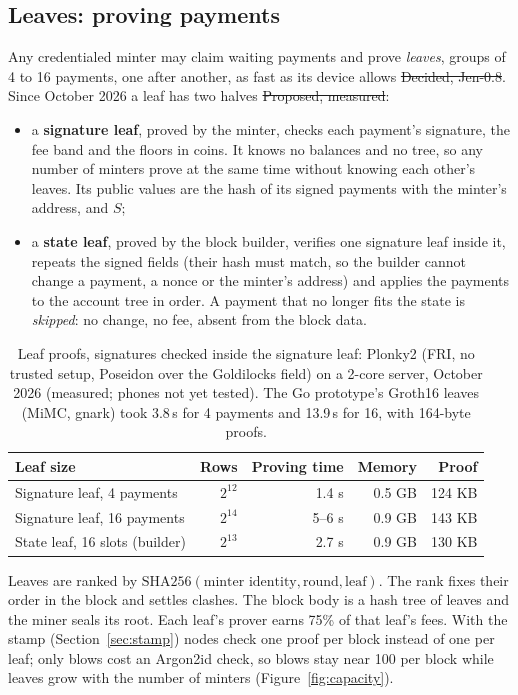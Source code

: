\subsection{Leaves: proving payments}
Any credentialed minter may claim waiting payments and prove \emph{leaves}, groups of 4 to 16 payments, one after another, as fast as its device allows \st{Decided, Jen-0.8}. Since October 2026 a leaf has two halves \st{Proposed, measured}:
\begin{itemize}
\item a \textbf{signature leaf}, proved by the minter, checks each payment's signature, the fee band and the floors in coins. It knows no balances and no tree, so any number of minters prove at the same time without knowing each other's leaves. Its public values are the hash of its signed payments with the minter's address, and $S$;
\item a \textbf{state leaf}, proved by the block builder, verifies one signature leaf inside it, repeats the signed fields (their hash must match, so the builder cannot change a payment, a nonce or the minter's address) and applies the payments to the account tree in order. A payment that no longer fits the state is \emph{skipped}: no change, no fee, absent from the block data.
\end{itemize}

\begin{table}[htbp]
\centering\small
\begin{tabular}{l r r r r}
\toprule
\textbf{Leaf size} & \textbf{Rows} & \textbf{Proving time} & \textbf{Memory} & \textbf{Proof}\\
\midrule
Signature leaf, 4 payments & $2^{12}$ & 1.4 s & 0.5 GB & 124 KB\\
Signature leaf, 16 payments & $2^{14}$ & 5--6 s & 0.9 GB & 143 KB\\
State leaf, 16 slots (builder) & $2^{13}$ & 2.7 s & 0.9 GB & 130 KB\\
\bottomrule
\end{tabular}
\caption{Leaf proofs, signatures checked inside the signature leaf: Plonky2 (FRI, no trusted setup, Poseidon over the Goldilocks field) on a 2-core server, October 2026 (measured; phones not yet tested). The Go prototype's Groth16 leaves (MiMC, gnark) took 3.8\,s for 4 payments and 13.9\,s for 16, with 164-byte proofs.}
\label{tab:leaf}
\end{table}

Leaves are ranked by $\mathrm{SHA256}(\text{minter identity}, \text{round}, \text{leaf})$. The rank fixes their order in the block and settles clashes. The block body is a hash tree of leaves and the miner seals its root. Each leaf's prover earns 75\% of that leaf's fees. With the stamp (Section~\ref{sec:stamp}) nodes check one proof per block instead of one per leaf; only blows cost an Argon2id check, so blows stay near 100 per block while leaves grow with the number of minters (Figure~\ref{fig:capacity}).

